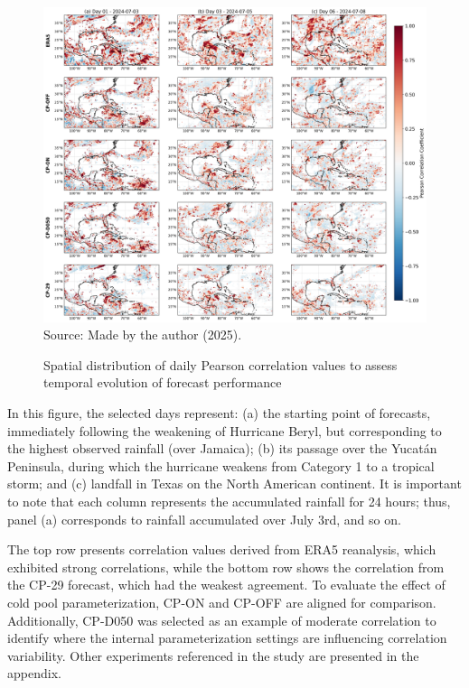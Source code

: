 \begin{figure}[!ht]
	\centering
	\caption{Spatial distribution of daily Pearson correlation values to assess temporal evolution of forecast performance} %
	\includegraphics[width=\textwidth]{docs/figuras/chapter5/painel_correlation_selected_experiments_days_nomeado.png} 
	\vspace{0.5em}
	Source: Made by the author (2025).  %
	\label{fig:dpearson} %
\end{figure}

In this figure, the selected days represent: (a) the starting point of forecasts, immediately following the weakening of Hurricane Beryl, but corresponding to the highest observed rainfall (over Jamaica); (b) its passage over the Yucatán Peninsula, during which the hurricane weakens from Category 1 to a tropical storm; and (c) landfall in Texas on the North American continent. It is important to note that each column represents the accumulated rainfall for 24 hours; thus, panel (a) corresponds to rainfall accumulated over July 3rd, and so on.

The top row presents correlation values derived from ERA5 reanalysis, which exhibited strong correlations, while the bottom row shows the correlation from the CP-29 forecast, which had the weakest agreement. To evaluate the effect of cold pool parameterization, CP-ON and CP-OFF are aligned for comparison. Additionally, CP-D050 was selected as an example of moderate correlation to identify where the internal parameterization settings are influencing correlation variability. Other experiments referenced in the study are presented in the appendix.

